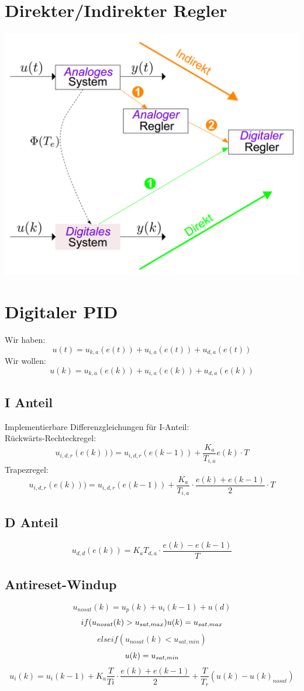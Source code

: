\section{Direkter/Indirekter Regler}
\begin{center}
	\includegraphics[scale = 0.25]{images/direkter_indirekter.png}
\end{center}

\section{Digitaler PID}
Wir haben:
\[
	u(t)=u_{k,a}(e(t))+u_{i,a}(e(t))+u_{d,a}(e(t))
\]
Wir wollen:
\[
	u(k)=u_{k,a}(e(k))+u_{i,a}(e(k))+u_{d,a}(e(k))
\]
\subsection{I Anteil}
Implementierbare Differenzgleichungen für I-Anteil:\\
Rückwärts-Rechteckregel:
\[
	u_{i,d,r}(e(k)))=u_{i,d,r}(e(k-1))+\frac{K_a}{T_{i,a}}e(k)\cdot T
\]
Trapezregel:
\[
	u_{i,d,r}(e(k)))=u_{i,d,r}(e(k-1))+\frac{K_a}{T_{i,a}}\cdot \frac{e(k)+e(k-1)}{2}\cdot T
\]
\subsection{D Anteil}
\[
	u_{d,d}(e(k))=K_aT_{d,a} \cdot \frac{e(k)-e(k-1)}{T}
\]
\subsection{Antireset-Windup}
\[
	u_{nosat}(k)= u_p(k)+u_i(k-1)+u(d)	
\]
\[
	if( u_{nosat}(k)>u_{sat,max})\\{u(k) =  u_{sat,max} } \\ \\ \\
\]
\[
	else if(u_{nosat}(k)<u_{sat,min})
\]
\[
	{u(k) =  u_{sat,min} } \\ \\
\]
\[
	u_i(k)= u_i(k-1)+K_a\frac{T}{Ti}\cdot\frac{e(k)+e(k-1)}{2}+\frac{T}{T_r}(u(k)-u(k)_{nosat})
\]
\\
